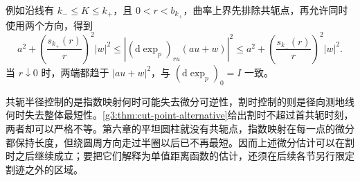 例如沿线有 \(k_-\le K\le k_+\)，且 \(0<r<b_{k_+}\)，曲率上界先排除共轭点，再允许同时使用两个方向，得到
\begin{equation}\label{g3:eq:exponential-length-two-sided}
	a^2+\left(\frac{s_{k_+}(r)}r\right)^2|w|^2
	\le |(\mathrm d\exp_p)_{ru}(au+w)|^2
	\le a^2+\left(\frac{s_{k_-}(r)}r\right)^2|w|^2.
\end{equation}
当 \(r\downarrow0\) 时，两端都趋于 \(|au+w|^2\)，与 \((\mathrm d\exp_p)_0=I\) 一致。

\ProseParagraphBreak

共轭半径控制的是指数映射何时可能失去微分可逆性，割时控制的则是径向测地线何时失去整体最短性。\cref{g3:thm:cut-point-alternative}给出割时不超过首共轭时刻，两者却可以严格不等。第六章的平坦圆柱就没有共轭点，指数映射在每一点的微分都保持长度，但绕圆周方向走过半圈以后已不再最短。因而上述微分估计可以在割时之后继续成立；要把它们解释为单值距离函数的估计，还须在后续各节另行限定割迹之外的区域。
